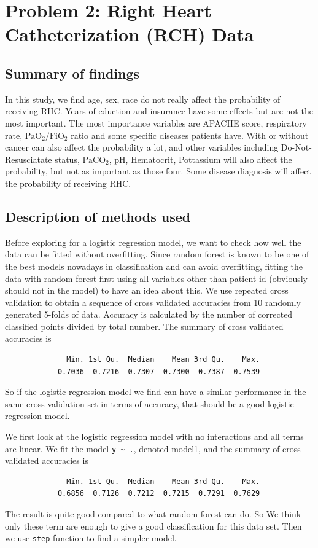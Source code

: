 \documentclass{article}
\begin{document}
\section{Problem 2: Right Heart Catheterization (RCH) Data}
\subsection{Summary of findings}
In this study, we find age, sex, race do not really affect the probability of receiving RHC. Years of eduction and insurance have some effects but are not the most important. The most importance variables are APACHE score, respiratory rate, $\mathrm{PaO}_2/\mathrm{FiO}_2$ ratio and some specific diseases patients have. With or without cancer can also affect the probability a lot, and other variables including Do-Not-Resusciatate status, $\mathrm{PaCO}_2$, pH, Hematocrit, Pottassium will also affect the probability, but not as important as those four. Some disease diagnosis will affect the probability of receiving RHC. 
\subsection{Description of methods used}
Before exploring for a logistic regression model, we want to check how well the data can be fitted without overfitting. Since random forest is known to be one of the best models nowadays in classification and can avoid overfitting, fitting the data with random forest first using all variables other than patient id (obviously should not in the model) to have an idea about this. We use repeated cross validation to obtain a sequence of cross validated accuracies from 10 randomly generated 5-folds of data. Accuracy is calculated by the number of corrected classified points divided by total number. The summary of cross validated accuracies is
\begin{verbatim}
              Min. 1st Qu.  Median    Mean 3rd Qu.    Max. 
            0.7036  0.7216  0.7307  0.7300  0.7387  0.7539 
     \end{verbatim}     

 So if the logistic regression model we find can have a similar performance in the same cross validation set in terms of accuracy, that should be a good logistic regression model.

 We first look at the logistic regression model with no interactions and all terms are linear. We fit the model \verb|y ~ .|, denoted model1, and the summary of cross validated accuracies is
 \begin{verbatim}
              Min. 1st Qu.  Median    Mean 3rd Qu.    Max. 
            0.6856  0.7126  0.7212  0.7215  0.7291  0.7629 
 \end{verbatim}
The result is quite good compared to what random forest can do. So We think only these term are enough to give a good classification for this data set. Then we use \verb|step| function to find a simpler model. 
\end{document}
